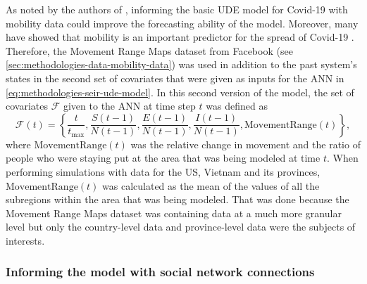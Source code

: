 As noted by the authors of \cite{dandekarMachineLearningAidedGlobal2020a}, informing the basic \gls{UDE} model for Covid-19 with mobility data could improve the forecasting ability of the model.
Moreover, many have showed that mobility is an important predictor for the spread of Covid-19 \cite{changMobilityNetworkModels2021,ihmecovid-19forecastingteamModelingCOVID19Scenarios2021,liSubstantialUndocumentedInfection2020}.
Therefore, the Movement Range Maps dataset from Facebook (see \autoref{sec:methodologies-data-mobility-data}) was used in addition to the past system's states in the second set of covariates that were given as inputs for the \gls{ANN} in \autoref{eq:methodologies-seir-ude-model}.
In this second version of the model, the set of covariates $\mathcal{F}$ given to the \gls{ANN} at time step $t$ was defined as
\begin{equation}
    \mathcal{F}(t) = \left\lbrace \frac{t}{t_\text{max}}, \frac{S(t-1)}{N(t-1)}, \frac{E(t-1)}{N(t-1)}, \frac{I(t-1)}{N(t-1)}, \text{MovementRange}(t) \right\rbrace,
\end{equation}
where $\text{MovementRange}(t)$ was the relative change in movement and the ratio of people who were staying put at the area that was being modeled at time $t$.
When performing simulations with data for the \gls{US}, Vietnam and its provinces, $\text{MovementRange}(t)$ was calculated as the mean of the values of all the subregions within the area that was being modeled.
That was done because the Movement Range Maps dataset was containing data at a much more granular level but only the country-level data and province-level data were the subjects of interests.

\subsubsection{Informing the model with social network connections}

